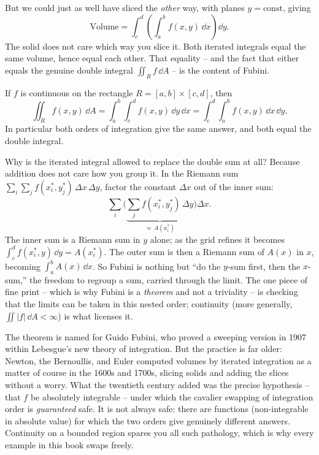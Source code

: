 But we could just as well have sliced the \emph{other} way, with planes
$y=\text{const}$, giving
\[
  \text{Volume}=\int_c^d\!\left(\int_a^b f(x,y)\,\dd x\right)\dd y .
\]
The solid does not care which way you slice it. Both iterated integrals equal the
same volume, hence equal each other. That equality -- and the fact that either
equals the genuine double integral $\iint_R f\,\dd A$ -- is the content of
Fubini.

\begin{theorem}
\label{ch34:thm-fubini}
If $f$ is continuous on the rectangle $R=[a,b]\times[c,d]$, then
\[
  \iint_R f(x,y)\,\dd A
  =\int_a^b\!\int_c^d f(x,y)\,\dd y\,\dd x
  =\int_c^d\!\int_a^b f(x,y)\,\dd x\,\dd y .
\]
In particular both orders of integration give the same answer, and both equal the
double integral.
\end{theorem}

\begin{whybox}
Why is the iterated integral allowed to replace the double sum at all? Because
addition does not care how you group it. In the Riemann sum
$\sum_i\sum_j f(x_i^\ast,y_j^\ast)\,\Delta x\,\Delta y$, factor the constant
$\Delta x$ out of the inner sum:
\[
  \sum_i\Big(\underbrace{\sum_j f(x_i^\ast,y_j^\ast)\,\Delta y}_{\approx\,A(x_i^\ast)}\Big)\Delta x .
\]
The inner sum is a Riemann sum in $y$ alone; as the grid refines it becomes
$\int_c^d f(x_i^\ast,y)\,\dd y=A(x_i^\ast)$. The outer sum is then a Riemann sum
of $A(x)$ in $x$, becoming $\int_a^b A(x)\,\dd x$. So Fubini is nothing but
``do the $y$-sum first, then the $x$-sum,'' the freedom to regroup a sum, carried
through the limit. The one piece of fine print -- which is why Fubini is a
\emph{theorem} and not a triviality -- is checking that the limits can be taken
in this nested order; continuity (more generally, $\iint|f|\,\dd A<\infty$) is
what licenses it.
\end{whybox}

\begin{historybox}
The theorem is named for Guido Fubini, who proved a sweeping version in 1907
within Lebesgue's new theory of integration. But the practice is far older:
Newton, the Bernoullis, and Euler computed volumes by iterated integration as a
matter of course in the 1600s and 1700s, slicing solids and adding the slices
without a worry. What the twentieth century added was the precise hypothesis --
that $f$ be absolutely integrable -- under which the cavalier swapping of
integration order is \emph{guaranteed} safe. It is not always safe: there are
functions (non-integrable in absolute value) for which the two orders give
genuinely different answers. Continuity on a bounded region spares you all such
pathology, which is why every example in this book swaps freely.
\end{historybox}

